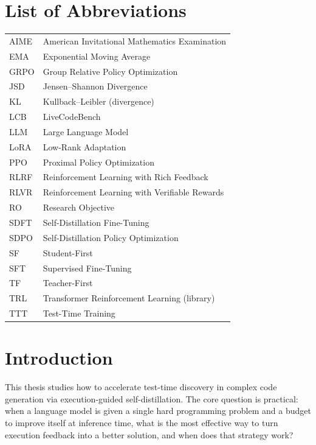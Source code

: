 \documentclass[12pt,a4paper]{report}
\begin{document}
\clearpage
\chapter*{List of Abbreviations}
\begin{longtable}{@{}p{2.6cm}l@{}}
AIME & American Invitational Mathematics Examination \\
EMA  & Exponential Moving Average \\
GRPO & Group Relative Policy Optimization \\
JSD  & Jensen--Shannon Divergence \\
KL   & Kullback--Leibler (divergence) \\
LCB  & LiveCodeBench \\
LLM  & Large Language Model \\
LoRA & Low-Rank Adaptation \\
PPO  & Proximal Policy Optimization \\
RLRF & Reinforcement Learning with Rich Feedback \\
RLVR & Reinforcement Learning with Verifiable Rewards \\
RO   & Research Objective \\
SDFT & Self-Distillation Fine-Tuning \\
SDPO & Self-Distillation Policy Optimization \\
SF   & Student-First \\
SFT  & Supervised Fine-Tuning \\
TF   & Teacher-First \\
TRL  & Transformer Reinforcement Learning (library) \\
TTT  & Test-Time Training \\
\end{longtable}

\chapter{Introduction}\label{chapter-1-introduction}

This thesis studies how to accelerate test-time discovery in complex code generation via execution-guided self-distillation. The core question is practical: when a language model is given a single hard programming problem and a budget to improve itself at inference time, what is the most effective way to turn execution feedback into a better solution, and when does that strategy work?
\end{document}
